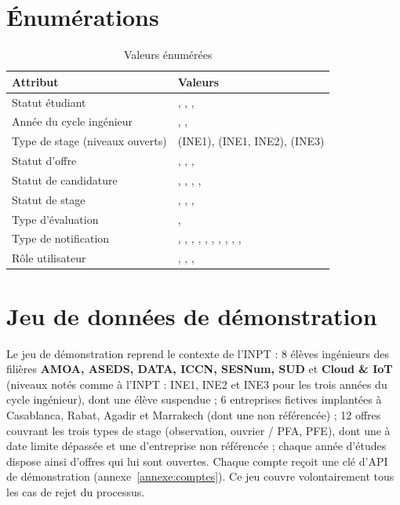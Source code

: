 \section{Énumérations}
\begin{table}[htbp]
\centering
\caption{Valeurs énumérées}
\begin{tabularx}{\textwidth}{@{}lY@{}}
\toprule
\textbf{Attribut} & \textbf{Valeurs} \\
\midrule
Statut étudiant & , , ,  \\
Année du cycle ingénieur & , ,  \\
Type de stage (niveaux ouverts) &  (INE1),  (INE1, INE2),  (INE3) \\
Statut d'offre & , , ,  \\
Statut de candidature & , , , ,  \\
Statut de stage & , , ,  \\
Type d'évaluation & ,  \\
Type de notification & , , , ,
  , , , , ,
  ,  \\
Rôle utilisateur & , , ,  \\
\bottomrule
\end{tabularx}
\end{table}

\section{Jeu de données de démonstration}
Le jeu de démonstration reprend le contexte de l'INPT : 8 élèves ingénieurs des filières
\textbf{AMOA, ASEDS, DATA, ICCN, SESNum, SUD} et \textbf{Cloud \& IoT} (niveaux notés comme à l'INPT :
INE1, INE2 et INE3 pour les trois années du cycle ingénieur), dont une élève
suspendue ; 6 entreprises fictives implantées à Casablanca, Rabat, Agadir et Marrakech (dont une non référencée) ;
12 offres couvrant les trois types de stage (observation, ouvrier / PFA, PFE), dont une à date limite dépassée et une
d'entreprise non référencée ; chaque année d'études dispose ainsi d'offres qui lui sont ouvertes. Chaque compte reçoit une clé d'API de
démonstration (annexe~\ref{annexe:comptes}). Ce jeu couvre volontairement tous les cas de rejet du processus.
